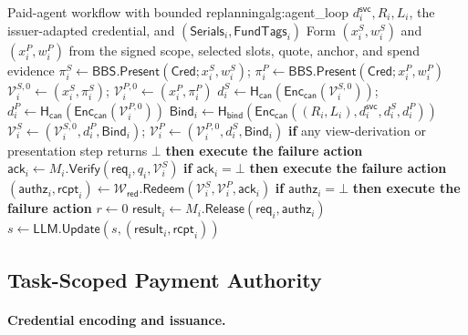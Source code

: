 \documentclass[letterpaper]{article}
\newcommand{\hash}{\mathsf{H}_{\mathsf{can}}}
\newcommand{\hashBind}{\mathsf{H}_{\mathsf{bind}}}
\begin{document}
\begin{MMAppendixAlgorithm}{Paid-agent workflow with bounded replanning}{alg:agent_loop}
      \(d_i^{\mathsf{svc}},R_i,L_i\), the issuer-adapted credential, and
      \((\mathsf{Serials}_i,\mathsf{FundTags}_i)\)
    \State Form \((x_i^S,w_i^S)\) and \((x_i^P,w_i^P)\) from the signed
      scope, selected slots, quote, anchor, and spend evidence
    \State \(\pi_i^S\leftarrow\mathsf{BBS.Present}
      (\mathsf{Cred};x_i^S,w_i^S)\); \quad
      \(\pi_i^P\leftarrow\mathsf{BBS.Present}
      (\mathsf{Cred};x_i^P,w_i^P)\)
    \State \(\mathcal V_i^{S,0}\leftarrow(x_i^S,\pi_i^S)\); \quad
      \(\mathcal V_i^{P,0}\leftarrow(x_i^P,\pi_i^P)\)
    \State \(d_i^S\leftarrow\hash(\mathsf{Enc}_{\mathsf{can}}
      (\mathcal V_i^{S,0}))\); \quad
      \(d_i^P\leftarrow\hash(\mathsf{Enc}_{\mathsf{can}}
      (\mathcal V_i^{P,0}))\)
    \State \(\mathsf{Bind}_i\leftarrow\hashBind(
      \mathsf{Enc}_{\mathsf{can}}((R_i,L_i),d_i^{\mathsf{svc}},d_i^S,d_i^P))\)
    \State \(\mathcal V_i^S\leftarrow
      (\mathcal V_i^{S,0},d_i^P,\mathsf{Bind}_i)\); \quad
      \(\mathcal V_i^P\leftarrow
      (\mathcal V_i^{P,0},d_i^S,\mathsf{Bind}_i)\)
    \State \textbf{if} any view-derivation or presentation step returns
      \(\bot\) \textbf{then execute the failure action}
    \State $\mathsf{ack}_i \leftarrow M_i.\mathsf{Verify}
    (\mathsf{req}_i,q_i,\mathcal{V}_i^{S})$
    \State \textbf{if} \(\mathsf{ack}_i=\bot\)
      \textbf{then execute the failure action}
    \State $(\mathsf{authz}_i,\mathsf{rcpt}_i) \leftarrow
    \mathcal{W}_{\mathsf{red}}.\mathsf{Redeem}
    (\mathcal{V}_i^{S},\mathcal{V}_i^{P},\mathsf{ack}_i)$
    \State \textbf{if} \(\mathsf{authz}_i=\bot\)
      \textbf{then execute the failure action}
    \State \(r\leftarrow 0\)
    \State $\mathsf{result}_i \leftarrow
    M_i.\mathsf{Release}(\mathsf{req}_i,\mathsf{authz}_i)$
    \State $s \leftarrow \mathsf{LLM.Update}
      (s,(\mathsf{result}_i,\mathsf{rcpt}_i))$
\EndWhile
\end{MMAppendixAlgorithm}

\subsection{Task-Scoped Payment Authority}
\label{app:authorization-credential-construction}

\paragraph{Credential encoding and issuance.}
\label{app:credential-algorithms}
\end{document}
